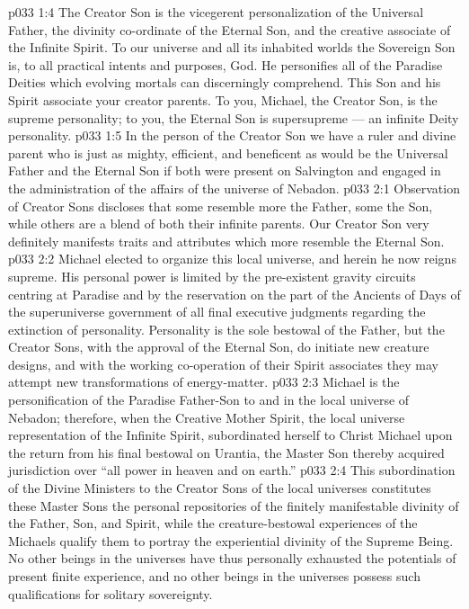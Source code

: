 \vs p033 1:4 The Creator Son is the vicegerent personalization of the Universal Father, the divinity co\hyp{}ordinate of the Eternal Son, and the creative associate of the Infinite Spirit. To our universe and all its inhabited worlds the Sovereign Son is, to all practical intents and purposes, God. He personifies all of the Paradise Deities which evolving mortals can discerningly comprehend. This Son and his Spirit associate  your creator parents. To you, Michael, the Creator Son, is the supreme personality; to you, the Eternal Son is supersupreme --- an infinite Deity personality.
\vs p033 1:5 \pc In the person of the Creator Son we have a ruler and divine parent who is just as mighty, efficient, and beneficent as would be the Universal Father and the Eternal Son if both were present on Salvington and engaged in the administration of the affairs of the universe of Nebadon.
\vs p033 2:1 Observation of Creator Sons discloses that some resemble more the Father, some the Son, while others are a blend of both their infinite parents. Our Creator Son very definitely manifests traits and attributes which more resemble the Eternal Son.
\vs p033 2:2 Michael elected to organize this local universe, and herein he now reigns supreme. His personal power is limited by the pre\hyp{}existent gravity circuits centring at Paradise and by the reservation on the part of the Ancients of Days of the superuniverse government of all final executive judgments regarding the extinction of personality. Personality is the sole bestowal of the Father, but the Creator Sons, with the approval of the Eternal Son, do initiate new creature designs, and with the working co\hyp{}operation of their Spirit associates they may attempt new transformations of energy\hyp{}matter.
\vs p033 2:3 \pc Michael is the personification of the Paradise Father\hyp{}Son to and in the local universe of Nebadon; therefore, when the Creative Mother Spirit, the local universe representation of the Infinite Spirit, subordinated herself to Christ Michael upon the return from his final bestowal on Urantia, the Master Son thereby acquired jurisdiction over “all power in heaven and on earth.”
\vs p033 2:4 This subordination of the Divine Ministers to the Creator Sons of the local universes constitutes these Master Sons the personal repositories of the finitely manifestable divinity of the Father, Son, and Spirit, while the creature\hyp{}bestowal experiences of the Michaels qualify them to portray the experiential divinity of the Supreme Being. No other beings in the universes have thus personally exhausted the potentials of present finite experience, and no other beings in the universes possess such qualifications for solitary sovereignty.
